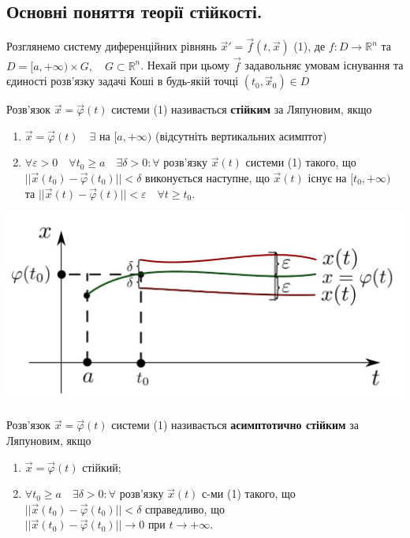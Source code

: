 \documentclass[14pt,a4paper]{scrartcl}
\theoremstyle{definition}
\theoremstyle{definition}
\theoremstyle{definition}
\begin{document}
\subsection{Основні поняття теорії стійкості.}
Розглянемо систему диференційних рівнянь $\overrightarrow{x}' = \overrightarrow{f}(t, \overrightarrow{x})$ (1), де $f : D \rightarrow \mathbb{R}^n$ та $D = [a, +\infty) \times G, \quad G \subset \mathbb{R}^n$. Нехай при цьому $\overrightarrow{f}$ задавольняє умовам існування та єдиності розв'язку задачі Коші в будь-якій точці $(t_0, \overrightarrow{x}_0) \in D$

\bd
Розв'язок $\overrightarrow{x} = \overrightarrow{\varphi}(t)$ системи (1) називається \textbf{стійким} за Ляпуновим, якщо

\begin{enumerate}
  \item $\overrightarrow{x} = \overrightarrow{\varphi}(t) \quad \exists  \text{ на } [a, +\infty)$ (відсутніть вертикальних асимптот)
  \item $\forall \varepsilon > 0 \quad \forall t_0 \geq a \quad \exists \delta > 0 : \forall $ розв'язку $\overrightarrow{x}(t)$ системи (1) такого, що $||\overrightarrow{x}(t_0) - \overrightarrow{\varphi}(t_0)|| < \delta$ виконується наступне, що $\overrightarrow{x}(t)$ існує на $[t_0, +\infty)$ та $||\overrightarrow{x}(t) - \overrightarrow{\varphi}(t)|| < \varepsilon \quad \forall t \geq t_0$.
\end{enumerate}
\ed

\begin{center} \includegraphics[scale=0.35]{assets/lect1.jpg} \end{center}

\bd
Розв'язок $\overrightarrow{x} = \overrightarrow{\varphi}(t)$ системи (1) називається \textbf{асимптотично стійким} за Ляпуновим, якщо

\begin{enumerate}
  \item $\overrightarrow{x} = \overrightarrow{\varphi}(t)$ стійкий;
  \item $\forall t_0 \geq a \quad \exists \delta > 0: \forall$ розв'язку $\overrightarrow{x}(t)$ с-ми (1) такого, що $||\overrightarrow{x}(t_0) - \overrightarrow{\varphi}(t_0)|| < \delta$ справедливо, що $||\overrightarrow{x}(t_0) - \overrightarrow{\varphi}(t_0)|| \rightarrow 0 \text{ при } t \rightarrow + \infty$.
\end{enumerate}
\end{document}
